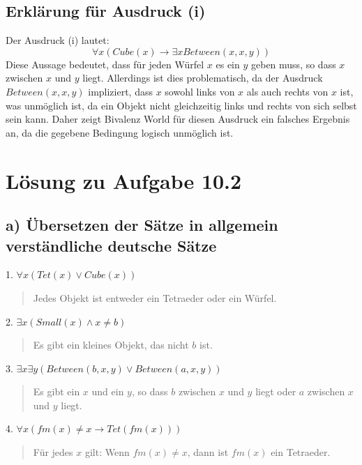 \documentclass{article}
\begin{document}
\subsection*{Erklärung für Ausdruck (i)}

Der Ausdruck (i) lautet:
\begin{equation*}
\forall x (Cube(x) \rightarrow \exists x Between(x, x, y))
\end{equation*}
Diese Aussage bedeutet, dass für jeden Würfel \(x\) es ein \(y\) geben muss, so dass \(x\) zwischen \(x\) und \(y\) liegt.
Allerdings ist dies problematisch, da der Ausdruck \(Between(x, x, y)\) impliziert, dass \(x\) sowohl links von \(x\) als auch rechts von \(x\) ist, was unmöglich ist, da ein Objekt nicht gleichzeitig links und rechts von sich selbst sein kann.
Daher zeigt Bivalenz World für diesen Ausdruck ein falsches Ergebnis an, da die gegebene Bedingung logisch unmöglich ist.

\section*{Lösung zu Aufgabe 10.2}

\subsection*{a) Übersetzen der Sätze in allgemein verständliche deutsche Sätze}

1. \(\forall x (Tet(x) \lor Cube(x))\)
   \begin{quote}
   Jedes Objekt ist entweder ein Tetraeder oder ein Würfel.
   \end{quote}
   
2. \(\exists x (Small(x) \land x \neq b)\)
   \begin{quote}
   Es gibt ein kleines Objekt, das nicht \(b\) ist.
   \end{quote}

3. \(\exists x \exists y (Between(b, x, y) \lor Between(a, x, y))\)
   \begin{quote}
   Es gibt ein \(x\) und ein \(y\), so dass \(b\) zwischen \(x\) und \(y\) liegt oder \(a\) zwischen \(x\) und \(y\) liegt.
   \end{quote}

4. \(\forall x (fm(x) \neq x \rightarrow Tet(fm(x)))\)
   \begin{quote}
   Für jedes \(x\) gilt: Wenn \(fm(x) \neq x\), dann ist \(fm(x)\) ein Tetraeder.
   \end{quote}
\end{document}
